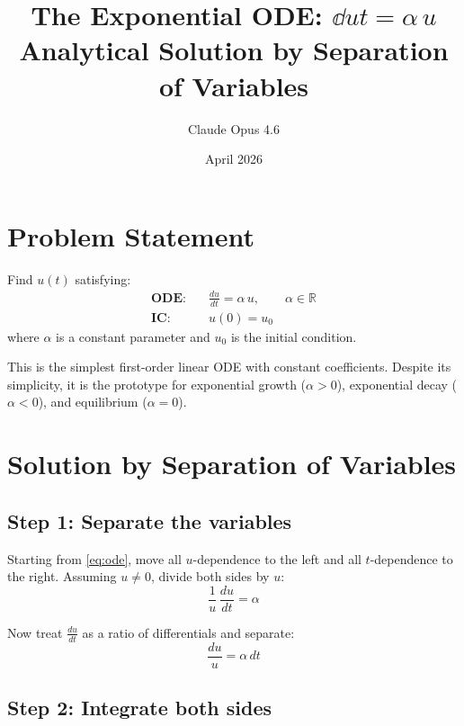 \documentclass[11pt]{article}
\title{The Exponential ODE: $\dd{u}{t} = \alpha\,u$\\[6pt]
\large Analytical Solution by Separation of Variables}
\author{Claude Opus 4.6}
\date{April 2026}
\newcommand{\dd}[2]{\frac{d #1}{d #2}}
\begin{document}
\maketitle

\section{Problem Statement}

\begin{tcolorbox}[colback=blue!5, colframe=blue!50!black, title=The Exponential ODE]
Find $u(t)$ satisfying:
\begin{align}
  \textbf{ODE:}& \quad \dd{u}{t} = \alpha\,u, \qquad \alpha \in \mathbb{R} \label{eq:ode}\\[6pt]
  \textbf{IC:}& \quad u(0) = u_0 \label{eq:ic}
\end{align}
where $\alpha$ is a constant parameter and $u_0$ is the initial condition.
\end{tcolorbox}

\medskip
\noindent
This is the simplest first-order linear ODE with constant coefficients.
Despite its simplicity, it is the prototype for exponential growth ($\alpha > 0$),
exponential decay ($\alpha < 0$), and equilibrium ($\alpha = 0$).

\section{Solution by Separation of Variables}

\subsection{Step 1: Separate the variables}

Starting from \eqref{eq:ode}, move all $u$-dependence to the left and all $t$-dependence to the right.
Assuming $u \neq 0$, divide both sides by $u$:
\begin{equation}
  \frac{1}{u}\,\dd{u}{t} = \alpha
  \label{eq:separated_implicit}
\end{equation}

Now treat $\dd{u}{t}$ as a ratio of differentials and separate:
\begin{equation}
  \boxed{\frac{du}{u} = \alpha\,dt}
  \label{eq:separated}
\end{equation}

\subsection{Step 2: Integrate both sides}
\end{document}
